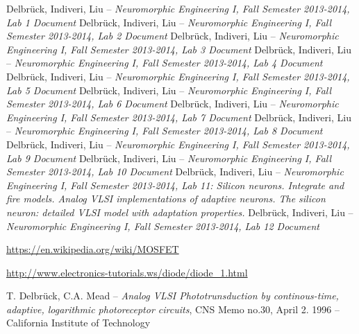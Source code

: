 \documentclass[main]{subfiles}
\begin{document}
\begin{thebibliography}{7}
Delbrück, Indiveri, Liu -- \emph{Neuromorphic Engineering I, Fall Semester 2013-2014, Lab 1 Document}
Delbrück, Indiveri, Liu -- \emph{Neuromorphic Engineering I, Fall Semester 2013-2014, Lab 2 Document}
Delbrück, Indiveri, Liu -- \emph{Neuromorphic Engineering I, Fall Semester 2013-2014, Lab 3 Document}
Delbrück, Indiveri, Liu -- \emph{Neuromorphic Engineering I, Fall Semester 2013-2014, Lab 4 Document}
Delbrück, Indiveri, Liu -- \emph{Neuromorphic Engineering I, Fall Semester 2013-2014, Lab 5 Document}
Delbrück, Indiveri, Liu -- \emph{Neuromorphic Engineering I, Fall Semester 2013-2014, Lab 6 Document}
Delbrück, Indiveri, Liu -- \emph{Neuromorphic Engineering I, Fall Semester 2013-2014, Lab 7 Document}
Delbrück, Indiveri, Liu -- \emph{Neuromorphic Engineering I, Fall Semester 2013-2014, Lab 8 Document}
Delbrück, Indiveri, Liu -- \emph{Neuromorphic Engineering I, Fall Semester 2013-2014, Lab 9 Document}
Delbrück, Indiveri, Liu -- \emph{Neuromorphic Engineering I, Fall Semester 2013-2014, Lab 10 Document}
Delbrück, Indiveri, Liu -- \emph{Neuromorphic Engineering I, Fall Semester 2013-2014, Lab 11: Silicon neurons. Integrate and fire models. Analog VLSI implementations of adaptive neurons. The silicon neuron: detailed VLSI model with adaptation properties. }
Delbrück, Indiveri, Liu -- \emph{Neuromorphic Engineering I, Fall Semester 2013-2014, Lab 12 Document}

\url{https://en.wikipedia.org/wiki/MOSFET}

\url{http://www.electronics-tutorials.ws/diode/diode_1.html}

T. Delbrück, C.A. Mead -- \emph{Analog VLSI Phototrunsduction by continous-time, adaptive, logarithmic photoreceptor circuits}, CNS Memo no.30, April 2. 1996 -- California Institute of Technology

\end{thebibliography}
\end{document}
